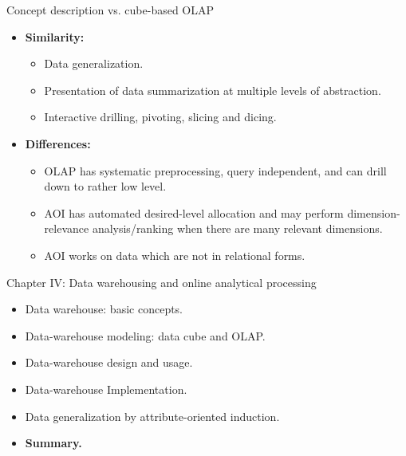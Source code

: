 \documentclass[aspectratio=169,t]{beamer}
\begin{document}
  { 
    \begin{frame}{Concept description vs. cube-based OLAP}
    \begin{itemize}
      \item \textbf{Similarity:}
      \begin{itemize}
        \item Data generalization.
        \item Presentation of data summarization at multiple levels of abstraction.
        \item Interactive drilling, pivoting, slicing and dicing.
      \end{itemize}
      \item \textbf{Differences:}
      \begin{itemize}
        \item OLAP has systematic preprocessing, query independent, and can drill down to rather low level.
        \item AOI has automated desired-level allocation and may perform dimension-relevance analysis/ranking when there are many relevant dimensions.
        \item AOI works on data which are not in relational forms.
      \end{itemize}
    \end{itemize}
    \end{frame}
  }

  { 
    \begin{frame}{Chapter IV: Data warehousing and online analytical processing}
        \begin{itemize}
            \item Data warehouse: basic concepts.
            \item Data-warehouse modeling: data cube and OLAP.
            \item Data-warehouse design and usage.
            \item Data-warehouse Implementation.
            \item Data generalization by attribute-oriented induction.
            \item \textbf{Summary.}
        \end{itemize}
    \end{frame}
  }
\end{document}
